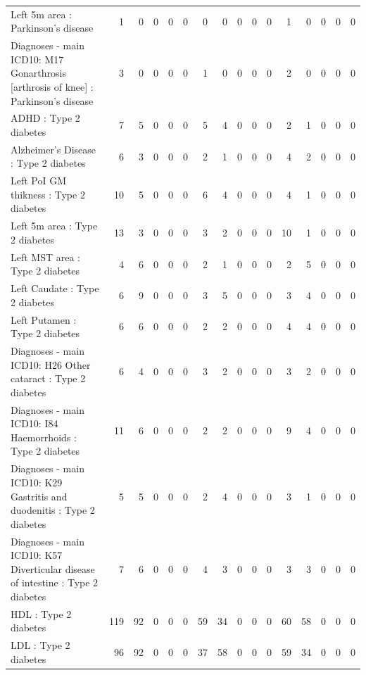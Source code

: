 \begin{table}[ht]
\begin{tabular}{lrrrrrrrrrrrrrrr}
  Left 5m area : Parkinson's disease &   1 &   0 &   0 &   0 &   0 &   0 &   0 &   0 &   0 &   0 &   1 &   0 &   0 &   0 &   0 \\ 
  Diagnoses - main ICD10: M17 Gonarthrosis [arthrosis of knee] : Parkinson's disease &   3 &   0 &   0 &   0 &   0 &   1 &   0 &   0 &   0 &   0 &   2 &   0 &   0 &   0 &   0 \\ 
  ADHD : Type 2 diabetes &   7 &   5 &   0 &   0 &   0 &   5 &   4 &   0 &   0 &   0 &   2 &   1 &   0 &   0 &   0 \\ 
  Alzheimer's Disease : Type 2 diabetes &   6 &   3 &   0 &   0 &   0 &   2 &   1 &   0 &   0 &   0 &   4 &   2 &   0 &   0 &   0 \\ 
  Left PoI GM thikness : Type 2 diabetes &  10 &   5 &   0 &   0 &   0 &   6 &   4 &   0 &   0 &   0 &   4 &   1 &   0 &   0 &   0 \\ 
  Left 5m area : Type 2 diabetes &  13 &   3 &   0 &   0 &   0 &   3 &   2 &   0 &   0 &   0 &  10 &   1 &   0 &   0 &   0 \\ 
  Left MST area : Type 2 diabetes &   4 &   6 &   0 &   0 &   0 &   2 &   1 &   0 &   0 &   0 &   2 &   5 &   0 &   0 &   0 \\ 
  Left Caudate : Type 2 diabetes &   6 &   9 &   0 &   0 &   0 &   3 &   5 &   0 &   0 &   0 &   3 &   4 &   0 &   0 &   0 \\ 
  Left Putamen : Type 2 diabetes &   6 &   6 &   0 &   0 &   0 &   2 &   2 &   0 &   0 &   0 &   4 &   4 &   0 &   0 &   0 \\ 
  Diagnoses - main ICD10: H26 Other cataract : Type 2 diabetes &   6 &   4 &   0 &   0 &   0 &   3 &   2 &   0 &   0 &   0 &   3 &   2 &   0 &   0 &   0 \\ 
  Diagnoses - main ICD10: I84 Haemorrhoids : Type 2 diabetes &  11 &   6 &   0 &   0 &   0 &   2 &   2 &   0 &   0 &   0 &   9 &   4 &   0 &   0 &   0 \\ 
  Diagnoses - main ICD10: K29 Gastritis and duodenitis : Type 2 diabetes &   5 &   5 &   0 &   0 &   0 &   2 &   4 &   0 &   0 &   0 &   3 &   1 &   0 &   0 &   0 \\ 
  Diagnoses - main ICD10: K57 Diverticular disease of intestine : Type 2 diabetes &   7 &   6 &   0 &   0 &   0 &   4 &   3 &   0 &   0 &   0 &   3 &   3 &   0 &   0 &   0 \\ 
  HDL : Type 2 diabetes & 119 &  92 &   0 &   0 &   0 &  59 &  34 &   0 &   0 &   0 &  60 &  58 &   0 &   0 &   0 \\ 
  LDL : Type 2 diabetes &  96 &  92 &   0 &   0 &   0 &  37 &  58 &   0 &   0 &   0 &  59 &  34 &   0 &   0 &   0 \\ 

\end{tabular}
\end{table}
